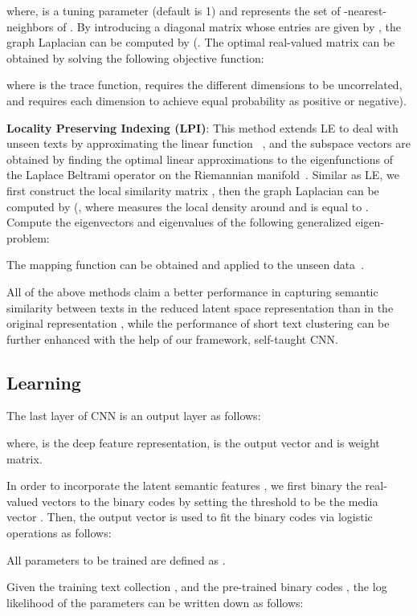 \documentclass[review]{elsarticle}
\begin{document}
where,  is a tuning parameter (default is 1) and  represents the set of -nearest-neighbors of . By introducing a diagonal  matrix  whose entries are given by , the graph Laplacian  can be computed by (. The optimal  real-valued matrix  can be obtained by solving the following objective function:

where  is the trace function,  requires the different dimensions to be uncorrelated, and  requires each dimension to achieve equal probability as positive or negative).

{\bf{Locality Preserving Indexing (LPI)}}: This method extends LE to deal with unseen texts by approximating the linear function ~\cite{28_zhang2010self}, and the subspace vectors are obtained by finding the optimal linear approximations to the eigenfunctions of the Laplace Beltrami operator on the Riemannian manifold~\cite{niyogi2004locality}. Similar as LE, we first construct the local similarity matrix , then the graph Laplacian  can be computed by (, where  measures the local density around  and is equal to . Compute the eigenvectors  and eigenvalues  of the following generalized eigen-problem:



The mapping function  can be obtained and applied to the unseen data~\cite{4_cai2005document}.

All of the above methods claim a better performance in capturing semantic similarity between texts in the reduced latent space representation  than in the original representation , while the performance of short text clustering can be further enhanced with the help of our framework, self-taught CNN.

\subsection{Learning}
The last layer of CNN is an output layer as follows:

where,  is the deep feature representation,  is the output vector and  is weight matrix.

In order to incorporate the latent semantic features , we first binary the real-valued vectors  to the binary codes  by setting the threshold to be the media vector . Then, the output vector  is used to fit the binary codes  via  logistic operations as follows:


All parameters to be trained are defined as .


Given the training text collection , and the pre-trained binary codes , the log likelihood of the parameters can be written down as follows:
\end{document}
